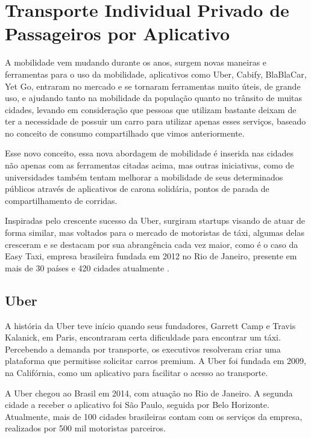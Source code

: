 
\section{Transporte Individual Privado de Passageiros por Aplicativo}

A mobilidade vem mudando durante os anos, surgem novas maneiras e ferramentas para o uso da mobilidade, aplicativos como Uber, Cabify, BlaBlaCar, Yet Go, entraram no mercado e se tornaram ferramentas muito úteis, de grande uso, e ajudando tanto na mobilidade da população quanto no trânsito de muitas cidades, levando em consideração que pessoas que utilizam bastante deixam de ter a necessidade de possuir um carro para utilizar apenas esses serviços, baseado no conceito de consumo compartilhado que vimos anteriormente.

Esse novo conceito, essa nova abordagem de mobilidade é inserida nas cidades não apenas com as ferramentas citadas acima, mas outras iniciativas, como de universidades também tentam melhorar a mobilidade de seus determinados públicos através de aplicativos de carona solidária, pontos de parada de compartilhamento de corridas.

Inspiradas pelo crescente sucesso da Uber, surgiram startups visando de atuar de forma similar, mas voltados para o mercado de motoristas de táxi, algumas delas cresceram e se destacam por sua abrangência cada vez maior, como é o caso da Easy Taxi, empresa brasileira fundada em 2012 no Rio de Janeiro, presente em mais de 30 países e 420 cidades atualmente \cite{caronae}.

\subsection{Uber}
A história da Uber teve início quando seus fundadores, Garrett Camp e Travis Kalanick, em Paris, encontraram certa dificuldade para encontrar um táxi. Percebendo a demanda por transporte, os executivos resolveram criar uma plataforma que permitisse solicitar carros premium. A Uber foi fundada em 2009, na Califórnia, como um aplicativo para facilitar o acesso ao transporte.

A Uber chegou ao Brasil em 2014, com atuação no Rio de Janeiro. A segunda cidade a receber o aplicativo foi São Paulo, seguida por Belo Horizonte. Atualmente, mais de 100 cidades brasileiras contam com os serviços da empresa, realizados por 500 mil motoristas parceiros. 

